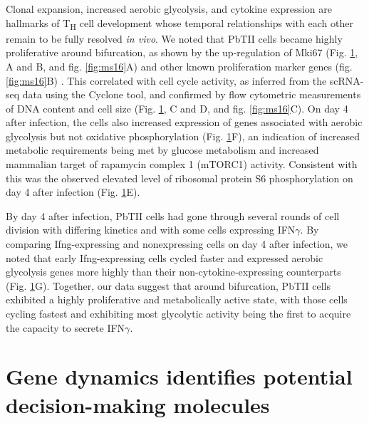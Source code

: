 \begin{figure}
    \label{fig:proliferation}
\end{figure}

Clonal expansion, increased aerobic glycolysis, and cytokine expression are hallmarks of T\textsubscript{H} cell development whose temporal relationships with each other remain to be fully resolved \textit{in vivo}. We noted that PbTII cells became highly proliferative around bifurcation, as shown by the up-regulation of Mki67 (Fig. \ref{fig:proliferation}, A and B, and fig. \ref{fig:ms16}A) and other known proliferation marker genes (fig. \ref{fig:ms16}B) \cite{Whitfield2006-jv}. This correlated with cell cycle activity, as inferred from the scRNA-seq data using the Cyclone tool, and confirmed by flow cytometric measurements of DNA content and cell size (Fig. \ref{fig:proliferation}, C and D, and fig. \ref{fig:ms16}C). On day 4 after infection, the cells also increased expression of genes associated with aerobic glycolysis but not oxidative phosphorylation (Fig. \ref{fig:proliferation}F), an indication of increased metabolic requirements being met by glucose metabolism and increased mammalian target of rapamycin complex 1 (mTORC1) activity. Consistent with this was the observed elevated level of ribosomal protein S6 phosphorylation on day 4 after infection (Fig. \ref{fig:proliferation}E).

By day 4 after infection, PbTII cells had gone through several rounds of cell division with differing kinetics and with some cells expressing IFN\( \gamma \). By comparing Ifng-expressing and nonexpressing cells on day 4 after infection, we noted that early Ifng-expressing cells cycled faster and expressed aerobic glycolysis genes more highly than their non-cytokine-expressing counterparts (Fig. \ref{fig:proliferation}G). Together, our data suggest that around bifurcation, PbTII cells exhibited a highly proliferative and metabolically active state, with those cells cycling fastest and exhibiting most glycolytic activity being the first to acquire the capacity to secrete IFN\( \gamma \).

\section{Gene dynamics identifies potential decision-making molecules}

